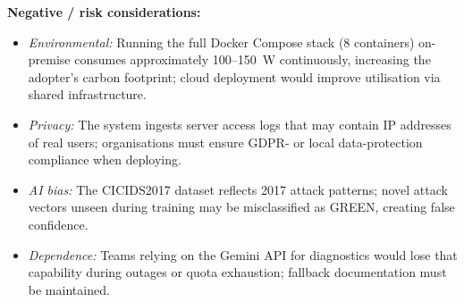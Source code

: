 \textbf{Negative / risk considerations:}
\begin{itemize}
  \item \textit{Environmental:} Running the full Docker Compose stack (8
        containers) on-premise consumes approximately 100--150~W continuously,
        increasing the adopter's carbon footprint; cloud deployment would
        improve utilisation via shared infrastructure.
  \item \textit{Privacy:} The system ingests server access logs that may
        contain IP addresses of real users; organisations must ensure GDPR-
        or local data-protection compliance when deploying.
  \item \textit{AI bias:} The CICIDS2017 dataset reflects 2017 attack patterns;
        novel attack vectors unseen during training may be misclassified as
        GREEN, creating false confidence.
  \item \textit{Dependence:} Teams relying on the Gemini API for diagnostics
        would lose that capability during outages or quota exhaustion; fallback
        documentation must be maintained.
\end{itemize}

